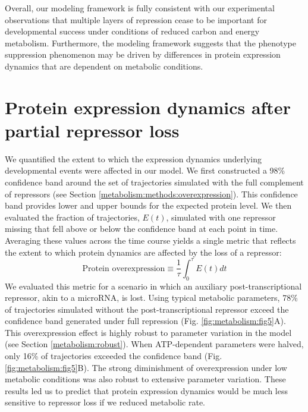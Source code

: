 Overall, our modeling framework is fully consistent with our experimental observations that multiple layers of repression cease to be important for developmental success under conditions of reduced carbon and energy metabolism. Furthermore, the modeling framework suggests that the phenotype suppression phenomenon may be driven by differences in protein expression dynamics that are dependent on metabolic conditions.

\section{Protein expression dynamics after partial repressor loss}

We quantified the extent to which the expression dynamics underlying developmental events were affected in our model. We first constructed a 98\% confidence band around the set of trajectories simulated with the full complement of repressors (see Section \ref{metabolism:methods:overexpression}). This confidence band provides lower and upper bounds for the expected protein level. We then evaluated the fraction of trajectories, $E(t)$, simulated with one repressor missing that fell above or below the confidence band at each point in time. Averaging these values across the time course yields a single metric that reflects the extent to which protein dynamics are affected by the loss of a repressor:
\begin{equation}
\text{Protein overexpression} \equiv \frac{1}{\tau}\int_{0}^{\tau}{E(t)}dt
\end{equation}
We evaluated this metric for a scenario in which an auxiliary post-transcriptional repressor, akin to a microRNA, is lost. Using typical metabolic parameters, 78\% of trajectories simulated without the post-transcriptional repressor exceed the confidence band generated under full repression (Fig. \ref{fig:metabolism:fig5}A). This overexpression effect is highly robust to parameter variation in the model (see Section \ref{metabolism:robust}). When ATP-dependent parameters were halved, only 16\% of trajectories exceeded the confidence band (Fig. \ref{fig:metabolism:fig5}B). The strong diminishment of overexpression under low metabolic conditions was also robust to extensive parameter variation. These results led us to predict that protein expression dynamics would be much less sensitive to repressor loss if we reduced metabolic rate.

